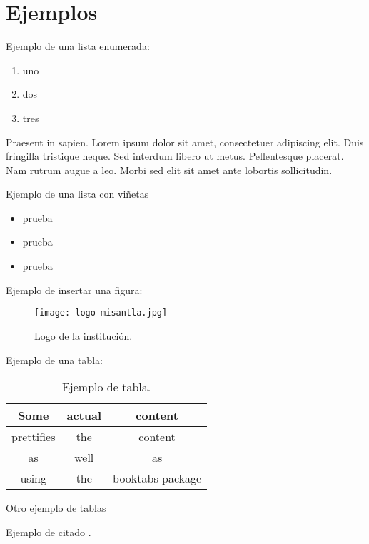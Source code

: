 \chapter{Ejemplos}

Ejemplo de una lista enumerada:

\begin{enumerate}
	\item uno
	\item dos
	\item tres
\end{enumerate}

Praesent in sapien. Lorem ipsum dolor sit amet, consectetuer adipiscing 
elit. Duis fringilla tristique neque. Sed interdum libero ut metus. 
Pellentesque placerat. Nam rutrum augue a leo. Morbi sed elit sit amet 
ante lobortis sollicitudin.

Ejemplo de una lista con viñetas

\begin{itemize}
	\item prueba 
	\item prueba 
	\item prueba
\end{itemize}

Ejemplo de insertar una figura:
\begin{figure}[!ht]
	\centering
	\texttt{[image: logo-misantla.jpg]}
	\caption{Logo de la institución.}
\end{figure}

Ejemplo de una tabla:

\begin{table}[h!]
	\centering
	\label{tab:table1}
	\begin{tabular}{ccc}
		\toprule
		Some & actual & content\\
		\midrule
		prettifies & the & content\\
		as & well & as\\
		using & the & booktabs package\\
		\bottomrule
	\end{tabular}
	\caption{Ejemplo de tabla.}
\end{table}

Otro ejemplo de tablas



Ejemplo de citado \cite{Vickrey1961}.

